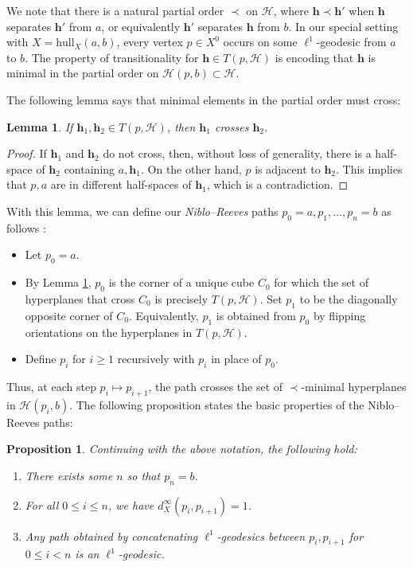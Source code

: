 \documentclass{amsart}
\newtheorem{proposition}[theorem]{Proposition}
\newtheorem{lemma}[theorem]{Lemma}
\theoremstyle{definition}
\theoremstyle{remark}
\theoremstyle{definition}
\newcommand{\hh}{{\sf h}}
\newcommand{\calH}{\mathcal{H}}
\renewcommand{\hh}{\mathbf{h}}
\newcommand{\hull}{\mathrm{hull}}
\begin{document}
We note that there is a natural partial order $\prec$ on $\calH$, where $\hh \prec \hh'$ when $\hh$ separates $\hh'$ from $a$, or equivalently $\hh'$ separates $\hh$ from $b$.  In our special setting with $X = \hull_X(a,b)$, every vertex $p \in X^0$ occurs on some $\ell^1$-geodesic from $a$ to $b$.  The property of transitionality for $\hh \in T(p,\calH)$ is encoding that $\hh$ is minimal in the partial order on $\calH(p,b) \subset \calH$.

The following lemma says that minimal elements in the partial order must cross:

\begin{lemma}\label{lem:trans cross}
If $\hh_1,\hh_2 \in T(p,\calH)$, then $\hh_1$ crosses $\hh_2$.
\end{lemma}

\begin{proof}
If $\hh_1$ and $\hh_2$ do not cross, then, without loss of generality, there is a half-space of $\hh_2$ containing $a, \hh_1$.  On the other hand, $p$ is adjacent to $\hh_2$.  This implies that $p,a$ are in different half-spaces of $\hh_1$, which is a contradiction.
\end{proof}

With this lemma, we can define our \emph{Niblo--Reeves} paths $p_0=a, p_1, \dots, p_n = b$ as follows \cite{NibloReeves}:

\begin{itemize}
\item Let $p_0 = a$.
\item By Lemma \ref{lem:trans cross}, $p_0$ is the corner of a unique cube $C_0$ for which the set of hyperplanes that cross $C_0$ is precisely $T(p,\calH)$.  Set $p_1$ to be the diagonally opposite corner of $C_0$.  Equivalently, $p_1$ is obtained from $p_0$ by flipping orientations on the hyperplanes in $T(p,\calH)$.
\item Define $p_i$ for $i \geq 1$ recursively with $p_i$ in place of $p_0$.
\end{itemize}



Thus, at each step $p_i \mapsto p_{i+1}$, the path crosses the set of $\prec$-minimal hyperplanes in $\calH(p_i,b)$.  The following proposition states the basic properties of the Niblo--Reeves paths:

\begin{proposition}\label{prop:NR basics}
Continuing with the above notation, the following hold:
\begin{enumerate}
\item There exists some $n$ so that $p_n=b$.
\item For all $0 \leq i \leq n$, we have $d^{\infty}_X(p_{i}, p_{i+1}) =1$.
\item Any path obtained by concatenating $\ell^1$-geodesics between $p_i, p_{i+1}$ for $0 \leq i < n$ is an $\ell^1$-geodesic.
\end{enumerate}
\end{proposition}
\end{document}
